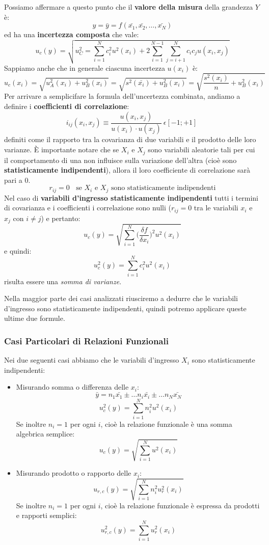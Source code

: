 \documentclass[a4paper,11pt]{report}
\begin{document}
Possiamo affermare a questo punto che il \textbf{valore della misura} della grandezza $Y$ è:
$$
  y = \bar{y} = f(\bar{x_1},\bar{x_2},\ldots,\bar{x_N})
$$ ed ha una \textbf{incertezza composta} che vale:
$$
  u_c(y) = \sqrt{  u_C^2 = \sum^N_{i = 1}c_i^2 u^2(x_i)+2\sum^{N-1}_{i = 1}\sum^{N}_{j = i +1}c_i c_j u(x_i,x_j)}
$$
Sappiamo anche che in generale ciascuna incertezza $u(x_i)$ è:
$$
  u_c(x_i) = \sqrt{u_A^2(x_i)+u_B^2(x_i)} = \sqrt{s^2(\bar{x_i})+u_B^2(x_i)} = \sqrt{\frac{s^2(x_i)}{n}+u_B^2(x_i)}
$$
Per arrivare a semplicifare la formula dell'uncertezza combinata, andiamo a definire i \textbf{coefficienti di correlazione}:
$$
  i_{ij}(x_i,x_j) \equiv \frac{u(x_i,x_j)}{u(x_i)\cdot u(x_j)}~\epsilon [-1;+1]~
$$ definiti come il rapporto tra la covarianza di due variabili e il prodotto delle loro varianze. È importante notare che se $X_i$ e $X_j$ sono variabili aleatorie tali per cui il comportamento di una non influisce sulla variazione dell'altra (cioè sono \textbf{statisticamente indipendenti}), allora il loro coefficiente di correlazione sarà pari a 0.
$$
    r_{ij} = 0~~~~\text{se $X_i$ e $X_j$ sono statisticamente indipendenti}
$$
Nel caso di \textbf{variabili d'ingresso statisticamente indipendenti} tutti i termini di covarianza e i coefficienti i correlazione sono nulli ($r_{ij} = 0$ tra le variabili $x_i$ e $x_j$ con $i \neq j$) e pertanto:
$$
  u_c(y) = \sqrt{\sum^{N}_{i = 1}\Bigg(\frac{\delta f}{\delta x_i}\Bigg)^2 u^2(x_i)}
$$ e quindi:
\begin{equation}
  \label{incertezza composta: formula generale}  
    u^2_c(y) = \sum^{N}_{i = 1}c_i^2 u^2 (x_i)
\end{equation}  
risulta essere una \textit{somma di varianze}.

Nella maggior parte dei casi analizzati riusciremo a dedurre che le variabili d'ingresso sono statisticamente indipendenti, quindi potremo applicare queste ultime due formule.
\subsubsection{Casi Particolari di Relazioni Funzionali}
Nei due seguenti casi abbiamo che le variabili d'ingresso $X_i$ sono statisticamente indipendenti:
\begin{itemize}
  \item Misurando somma o differenza delle $x_i$:
  $$
    \bar{y} = n_1\bar{x_1}\pm\ldots n_i\bar{x_i}\pm\ldots n_N\bar{x_N}
  $$
  $$
    u^2_c(y) = \sum^N_{i = 1}n_i^2 u^2(x_i)
  $$
  Se inoltre $n_i = 1$ per ogni $i$, cioè la relazione funzionale è una somma algebrica semplice:
  $$
    u_c(y) = \sqrt{\sum^N_{i = 1}u^2(x_i)}
  $$
  \item Misurando prodotto o rapporto delle $x_i$:
  $$
    u_{r,c}(y) = \sqrt{\sum^{N}_{i = 1}n_i^2 u_r^2(x_i)}
  $$
    Se inoltre $n_i = 1$ per ogni $i$, cioè la relazione funzionale è espressa da prodotti e rapporti semplici:
    $$
      u_{r,c}^2(y) = \sum^{N}_{i = 1}u_r^2(x_i)
    $$
\end{itemize}
\end{document}
